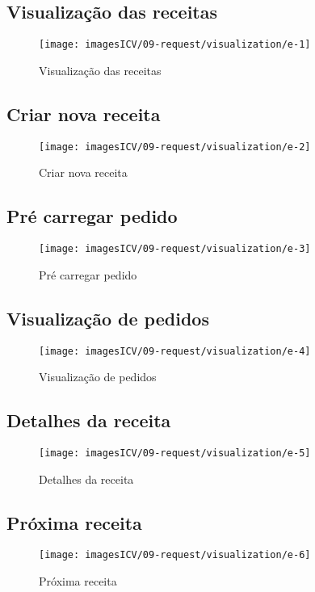 \usepackage{graphicx}
\usepackage{wasysym}
\newpage
\thispagestyle{fancy}
\vspace{\fill}

\subsection{\small Visualização das receitas}
\begin{figure}
    \centering
    \texttt{[image: imagesICV/09-request/visualization/e-1]}
    \caption{Visualização das receitas}
\end{figure}
\newpage

\thispagestyle{fancy}
\vspace{\fill}
\subsection{\small Criar nova receita}
\begin{figure}
    \centering
    \texttt{[image: imagesICV/09-request/visualization/e-2]}
    \caption{Criar nova receita}
\end{figure}
\newpage

\thispagestyle{fancy}
\vspace{\fill}
\subsection{\small Pré carregar pedido}
\begin{figure}
    \centering
    \texttt{[image: imagesICV/09-request/visualization/e-3]}
    \caption{Pré carregar pedido}
\end{figure}
\newpage

\thispagestyle{fancy}
\vspace{\fill}
\subsection{\small Visualização de pedidos}
\begin{figure}
    \centering
    \texttt{[image: imagesICV/09-request/visualization/e-4]}
    \caption{Visualização de pedidos}
\end{figure}
\newpage

\thispagestyle{fancy}
\vspace{\fill}
\subsection{\small Detalhes da receita}
\begin{figure}
    \centering
    \texttt{[image: imagesICV/09-request/visualization/e-5]}
    \caption{Detalhes da receita}
\end{figure}
\newpage

\thispagestyle{fancy}
\vspace{\fill}
\subsection{\small Próxima receita}
\begin{figure}
    \centering
    \texttt{[image: imagesICV/09-request/visualization/e-6]}
    \caption{Próxima receita}
\end{figure}
